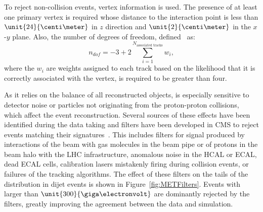 To reject non-collision events, vertex information is used. The presence of at least one primary vertex is required whose distance to the interaction point is less than $\unit{24}{\centi\meter}$ in $z$ direction and $\unit{2}{\centi\meter}$ in the $x$-$y$ plane. Also, the number of degrees of freedom, defined~\cite{Chatrchyan:2014fea} as:
\begin{equation}
n_{dof} = -3 + 2 \sum\limits_{i=1}^{N_{\text{associated tracks}}} w_i,
\end{equation}
where the $w_i$ are weights assigned to each track based on the likelihood that it is correctly associated with the vertex, is required to be greater than four.  

As it relies on the balance of all reconstructed objects, \MET is especially sensitive to detector noise or particles not originating from the proton-proton collisions, which affect the event reconstruction. Several sources of these effects have been identified during the data taking and filters have been developed in CMS to reject events matching their signatures~\cite{CMS-PAS-JME-12-002}. This includes filters for signal produced by interactions of the beam with gas molecules in the beam pipe or of protons in the beam halo with the LHC infrastructure, anomalous noise in the HCAL or ECAL, dead ECAL cells, calibration lasers mistakenly firing during collision events, or failures of the tracking algorithms. The effect of these filters on the tails of the \MET distribution in dijet events is shown in Figure~\ref{fig:METFilters}. Events with \MET larger than $\unit{300}{\giga\electronvolt}$ are dominantly rejected by the filters, greatly improving the agreement between the data and simulation.
